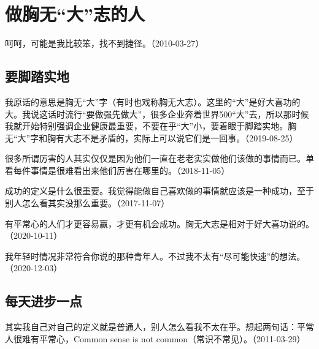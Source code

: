
\section{做胸无“大”志的人}


呵呵，可能是我比较笨，找不到捷径。（2010-03-27）

\subsection{要脚踏实地}

我原话的意思是胸无“大”字（有时也戏称胸无大志）。这里的“大”是好大喜功的大。我说这话时流行“要做强先做大”，很多企业奔着世界500“大”去，所以那时候我就开始特别强调企业健康最重要，不要在乎“大”小，要着眼于脚踏实地。胸无“大”字和胸有大志不是矛盾的，实际上可以说它们是一回事。（2019-08-25）


很多所谓厉害的人其实仅仅是因为他们一直在老老实实做他们该做的事情而已。单看每件事情是很难看出来他们厉害在哪里的。（2018-11-05）


成功的定义是什么很重要。我觉得能做自己喜欢做的事情就应该是一种成功，至于别人怎么看其实没那么重要。（2017-11-07）


有平常心的人们才更容易赢，才更有机会成功。胸无大志是相对于好大喜功说的。（2020-10-11）


我年轻时情况非常符合你说的那种青年人。不过我不太有“尽可能快速”的想法。（2020-12-03）

\subsection{每天进步一点}

其实我自己对自己的定义就是普通人，别人怎么看我不太在乎。想起两句话：平常人很难有平常心，Common sense is not common（常识不常见）。（2011-03-29）


